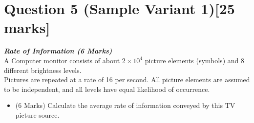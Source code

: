 \documentclass[]{article}
\begin{document}
\section{Question 5 (Sample Variant 1)[25 marks]}


\item[(b)] \textbf{\textit{Rate of Information (6 Marks)}}\\
A Computer monitor consists of about $2 \times 10^4$ picture elements (symbols) and 8
different brightness levels.\\
\newline
Pictures are repeated at a rate of 16 per second. All picture elements
are assumed to be independent, and all levels have equal likelihood of occurrence. 
\begin{itemize}
\item[(i)](6 Marks) Calculate the
average rate of information conveyed by this TV picture source.
\end{itemize}
\end{document}
